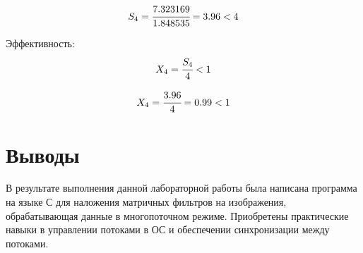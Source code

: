 \documentclass[a4paper, 12pt]{article}
\begin{document}
\begin{equation}
    S_4 = \cfrac{7.323169}{1.848535} = 3.96 < 4
\end{equation}

Эффективность:
\begin{equation}
    X_4 = \cfrac{S_4}{4} < 1
\end{equation}

\begin{equation}
    X_4 = \cfrac{3.96}{4} = 0.99 < 1
\end{equation}

\newpage
\section{Выводы}

В результате выполнения данной лабораторной работы была написана программа на языке С для наложения матричных фильтров на изображения, обрабатывающая данные в многопоточном режиме. Приобретены практические навыки в управлении потоками в ОС и обеспечении синхронизации между потоками.
\end{document}
